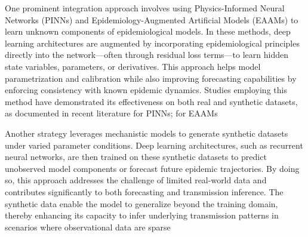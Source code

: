 One prominent integration approach involves using Physics-Informed Neural Networks (PINNs) and Epidemiology-Augmented Artificial Models (EAAMs) to learn unknown components of epidemiological models. In these methods, deep learning architectures are augmented by incorporating epidemiological principles directly into the network—often through residual loss terms—to learn hidden state variables, parameters, or derivatives. This approach helps model parametrization and calibration while also improving forecasting capabilities by enforcing consistency with known epidemic dynamics. Studies employing this method have demonstrated its effectiveness on both real and synthetic datasets, as documented in recent literature \cite{kharazmi_identifiability_2021, barmparis_physicsinformed_2022, de_rosa_modelling_2023, torku_seinn_2023,berkhahn_physics-informed_2022, rodriguez_einns_2023, shaier_data-driven_2022, bertaglia_asymptotic-preserving_2022, malinzi_determining_2022} for PINNs; \cite{liu_rolling_2023, otadi_universal_2017, liu_epidemiology-aware_2023, amini_mepognn_2023, sun_2022, gao_stan_2021, zheng_spatial-temporal_2021, ma_enhancing_2022, wang_causalgnn_2022, nguyen_becaked_2022, nguyen_becaked_2022-1} for EAAMs 


Another strategy leverages mechanistic models to generate synthetic datasets under varied parameter conditions. Deep learning architectures, such as recurrent neural networks, are then trained on these synthetic datasets to predict unobserved model components or forecast future epidemic trajectories. By doing so, this approach addresses the challenge of limited real-world data and contributes significantly to both forecasting and transmission inference. The synthetic data enable the model to generalize beyond the training domain, thereby enhancing its capacity to infer underlying transmission patterns in scenarios where observational data are sparse \cite{petrica_inverse_2023,liu_prediction_2023,rahnsch_network-based_2024,kumar_epidemic_2023,ji_climate-dependent_2023,vega_simlr_2022,chen_covid-19_2023,alsmadi_susceptible_2023,qiu_prediction_2022,mu_modelling_2023,wang_machine_2021,wu_computer_2022,yao_assessment_2022,zhang_prediction_2021,wyss_modeling_2023,gadewadikar_methodology_2024,zisad_integrated_2021,merkelbach_hybridml_2022,munoz_hybrid_2022,castillo_ossa_hybrid_2021,jiang_countrywide_2021,yasami_application_2022,liao_sirvd-dl_2021,zheng_predicting_2020,watson_pandemic_2021,liu_nesting_2023,wang_policy_2022,wang_hypothesis-free_2022,deng_dynamics_2020,kim_determination_2021,gupta_deep-siqrv_2023,bousquet_deep_2022,feng_data_2022,ding_biology-informed_2023,khan_attention_2022,kumaresan_analysis_2022,long_identification_2021}

